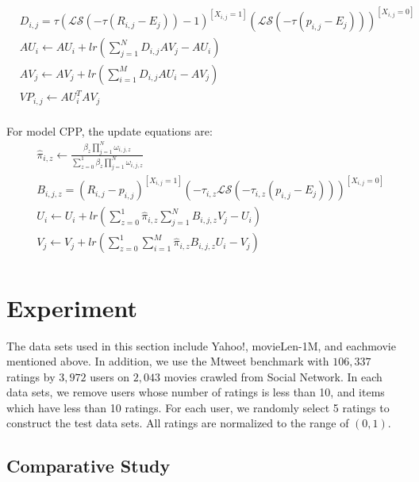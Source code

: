 \documentclass{sig-alternate}
\begin{document}
\begin{equation}
\begin{split}
&D_{i,j}=\tau(\mathcal{LS}(-\tau(R_{i,j}-E_{j}))-1)^{[X_{i,j}=1]}(\mathcal{LS}(-\tau(p_{i,j}-E_{j})))^{[X_{i,j}=0]} \\
&AU_{i}\leftarrow AU_{i}+lr(\sum\limits_{j=1}^{N}D_{i,j}AV_j-AU_{i}) \\
&AV_{j}\leftarrow AV_{j}+lr(\sum\limits_{i=1}^{M}D_{i,j}AU_{i}-AV_j) \\
&VP_{i,j} \leftarrow AU_{i}^{T}AV_{j} \\
\end{split}
\end{equation}

For model CPP, the update equations are:
\begin{equation}
\begin{split}
&\hat{\pi}_{i,z}\leftarrow\frac{\beta_z\prod_{j=1}^{N}\omega_{i,j,z}}{\sum_{z=0}^{1}\beta_z\prod_{j=1}^{N}\omega_{i,j,z}} \\
&B_{i,j,z}=(R_{i,j}-p_{i,j})^{[X_{i,j}=1]}(-\tau_{i,z}\mathcal{LS}(-\tau_{i,z}(p_{i,j}-E_{j})))^{[X_{i,j}=0]} \\
&U_{i}\leftarrow U_{i}+lr(\sum\limits_{z=0}^{1}\hat{\pi}_{i,z}\sum\limits_{j=1}^{N}B_{i,j,z}V_j-U_{i}) \\
&V_j\leftarrow V_j+lr(\sum\limits_{z=0}^{1}\sum\limits_{i=1}^{M}\hat{\pi}_{i,z}B_{i,j,z}U_{i}-V_j) \\
\end{split}
\end{equation}

\section{Experiment}\label{sec:experiment}

The data sets used in this section include Yahoo!, movieLen-1M, and eachmovie mentioned above. In addition, we use the Mtweet benchmark with $106,337$ ratings by $3,972$ users on $2,043$ movies crawled from Social Network. In each data sets, we remove users whose number of ratings is less than 10, and items which have less than 10 ratings. For each user, we randomly select 5 ratings to construct the test data sets. All ratings are normalized to the range of $(0,1)$.


\subsection{Comparative Study}
\end{document}
